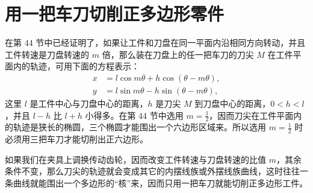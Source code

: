 \section{用一把车刀切削正多边形零件}

在第 44 节中已经证明了，如果让工件和刀盘在同一平面内沿相同方向转动，并且工件转速是刀盘转速的 $m$ 倍，那么装在刀盘上的任一把车刀的刀尖 $M$ 在工件平面内的轨迹，可用下面的方程表示：
\begin{align*}
  x &= l\cos m\theta + h\cos(\theta - m\theta), \\
  y &= l\sin m\theta - h\sin(\theta - m\theta),
\end{align*}
这里 $l$ 是工件中心与刀盘中心的距离，$h$ 是刀尖 $M$ 到刀盘中心的距离，$0<h<l$，并且 $l-h$ 比 $l+h$ 小得多。在第 44 节中选用 $m=\frac{1}{2}$，因而刀尖在工件平面内的轨迹是狭长的椭圆，三个椭圆才能围出一个六边形区域来。所以选用 $m=\frac{1}{2}$ 时必须用三把车刀才能切削出正六边形。

如果我们在夹具上调换传动齿轮，因而改变工件转速与刀盘转速的比值 $m$，其余条件不变，那么刀尖的轨迹就会变成其它的内摆线族或外摆线族曲线，这时往往一条曲线就能围出一个多边形的“核”来，因而只用一把车刀就能切削正多边形工件。

